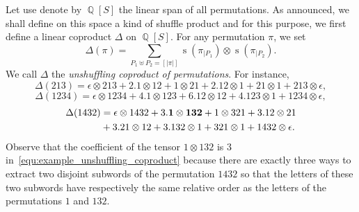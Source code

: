 \documentclass[a4paper,10pt]{llncs}
\DeclareMathOperator{\QQ}{\mathbb{Q}}
\DeclareMathOperator{\STD}{\mathrm{s}}
\begin{document}
Let use denote by $\QQ[S]$ the linear span of all permutations. As
announced, we shall define on this space a kind of shuffle product and
for this purpose, we first define a linear coproduct $\Delta$ on $\QQ[S]$.
For any permutation $\pi$, we set
\begin{equation} \label{equ:unshuffling_coproduct}
    \Delta(\pi) =
    \sum_{P_1 \uplus P_2 = [|\pi|]}
    \STD\left(\pi_{|P_1}\right) \otimes \STD\left(\pi_{|P_2}\right).
\end{equation}
We call $\Delta$ the {\em unshuffling coproduct of permutations}. For
instance,
\begin{equation}
    \Delta(213) =
    \epsilon \otimes 213 + 2. 1 \otimes 12 +
    1 \otimes 21 + 2. 12 \otimes 1 + 21 \otimes 1 + 213 \otimes \epsilon,
\end{equation}
\begin{equation}
    \Delta(1234) =
    \epsilon \otimes 1234 + 4. 1 \otimes 123 + 6. 12 \otimes 12 +
    4. 123 \otimes 1 + 1234 \otimes \epsilon,
\end{equation}
\begin{equation}\begin{split} \label{equ:example_unshuffling_coproduct}
    \Delta(1432) & =
    \epsilon \otimes 1432 + 3. {\bf 1 \otimes 132} + 1 \otimes 321 +
    3. 12 \otimes 21 \\ & + 3. 21 \otimes 12 + 3. 132 \otimes 1 +
    321 \otimes 1 + 1432 \otimes \epsilon.
\end{split}\end{equation}
Observe that the coefficient of the tensor $1 \otimes 132$ is $3$
in~\eqref{equ:example_unshuffling_coproduct} because there are exactly
three ways to extract two disjoint subwords of the permutation $1432$
so that the letters of these two subwords have respectively the same
relative order as the letters of the permutations $1$ and $132$.
\medskip
\end{document}
